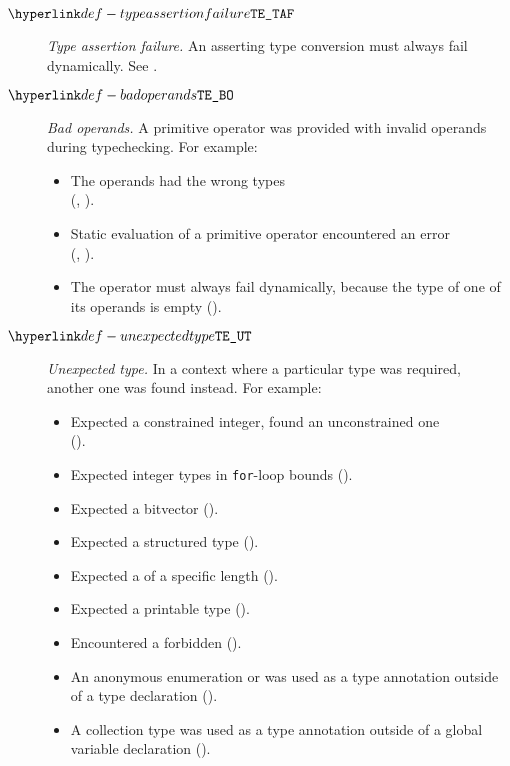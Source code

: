 \begin{description}
\hypertarget{def-typeassertionfailure}{}
\item[$\TypeAssertionFailure$]
  \textit{Type assertion failure.}
  An asserting type conversion must always fail dynamically.
  See .

\hypertarget{def-badoperands}{}
\item[$\BadOperands$]
  \textit{Bad operands.}
  A primitive operator was provided with invalid operands during typechecking.
  For example:
  \begin{itemize}
    \item The operands had the wrong types \\
      (, ).
    \item Static evaluation of a primitive operator encountered an error \\
      (, ).
    \item The operator must always fail dynamically, because the type of one of its operands is empty ().
  \end{itemize}

\hypertarget{def-unexpectedtype}{}
\item[$\UnexpectedType$]
  \textit{Unexpected type.}
  In a context where a particular type was required, another one was found instead.
  For example:
  \begin{itemize}
    \item Expected a constrained integer, found an unconstrained one \\
      ().
    \item Expected integer types in \texttt{for}-loop bounds ().
    \item Expected a bitvector ().
    \item Expected a structured type ().
    \item Expected a \tupletypeterm{} of a specific length ().
    \item Expected a printable type ().
    \item Encountered a forbidden \pendingconstrainedintegertype{} ().
    \item An anonymous enumeration or \structuredtype{} was used as a type annotation outside of a type declaration ().
    \item A collection type was used as a type annotation outside of a global variable declaration ().
  \end{itemize}


\end{description}
